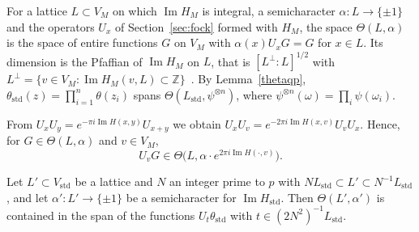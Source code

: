 For a lattice $L\subset V_M$ on which $\operatorname{Im}H_M$ is integral, a semicharacter $\alpha\colon L\to\{\pm1\}$ and the operators $U_x$ of Section~\ref{sec:fock} formed with $H_M$, the space $\Theta(L,\alpha)$ is the space of entire functions $G$ on $V_M$ with $\alpha(x)U_xG=G$ for $x\in L$. Its dimension is the Pfaffian of $\operatorname{Im}H_M$ on $L$, that is $[L^\perp:L]^{1/2}$ with $L^\perp=\{v\in V_M:\operatorname{Im}H_M(v,L)\subset\mathbb Z\}$~\cite[Theorem~3.2.7]{birkenhakelange}. By Lemma~\ref{thetaqp}, $\theta_{\mathrm{std}}(z)=\prod_{i=1}^n\theta(z_i)$ spans $\Theta(L_{\mathrm{std}},\psi^{\otimes n})$, where $\psi^{\otimes n}(\omega)=\prod_i\psi(\omega_i)$.

From $U_xU_y=e^{-\pi i\operatorname{Im}H(x,y)}U_{x+y}$ we obtain $U_xU_v=e^{-2\pi i\operatorname{Im}H(x,v)}U_vU_x$. Hence, for $G\in\Theta(L,\alpha)$ and $v\in V_M$,
\begin{equation}\label{transchar}
U_vG\in\Theta\big(L,\alpha\cdot e^{2\pi i\operatorname{Im}H(\cdot,v)}\big).
\end{equation}

\begin{lemma}\label{thetaspan}
Let $L'\subset V_{\mathrm{std}}$ be a lattice and $N$ an integer prime to $p$ with $NL_{\mathrm{std}}\subset L'\subset N^{-1}L_{\mathrm{std}}$, and let $\alpha'\colon L'\to\{\pm1\}$ be a semicharacter for $\operatorname{Im}H_{\mathrm{std}}$. Then $\Theta(L',\alpha')$ is contained in the span of the functions $U_t\theta_{\mathrm{std}}$ with $t\in(2N^2)^{-1}L_{\mathrm{std}}$.
\end{lemma}

